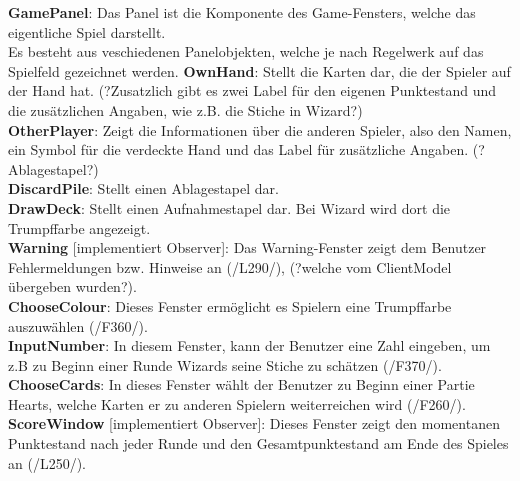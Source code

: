 \documentclass{article}
\begin{document}
\textbf{GamePanel}: Das Panel ist die Komponente des Game-Fensters, welche das eigentliche Spiel darstellt.\\
Es besteht aus veschiedenen Panelobjekten, welche je nach Regelwerk auf das Spielfeld gezeichnet werden.
\textbf{OwnHand}: Stellt die Karten dar, die der Spieler auf der Hand hat. (?Zusatzlich gibt es zwei Label für den eigenen Punktestand und die zusätzlichen Angaben, wie z.B. die Stiche in Wizard?)\\
\textbf{OtherPlayer}: Zeigt die Informationen über die anderen Spieler, also den Namen, ein Symbol für die verdeckte Hand und das Label für zusätzliche Angaben. (?Ablagestapel?)\\
\textbf{DiscardPile}: Stellt einen Ablagestapel dar.\\
\textbf{DrawDeck}: Stellt einen Aufnahmestapel dar. Bei Wizard wird dort die Trumpffarbe angezeigt.\\

\textbf{Warning} [implementiert Observer]: Das Warning-Fenster zeigt dem Benutzer Fehlermeldungen bzw. Hinweise an (/L290/), (?welche vom ClientModel übergeben wurden?). \\

\textbf{ChooseColour}: Dieses Fenster ermöglicht es Spielern eine Trumpffarbe auszuwählen (/F360/). \\

\textbf{InputNumber}: In diesem Fenster, kann der Benutzer eine Zahl eingeben, um z.B zu Beginn einer Runde Wizards seine Stiche zu schätzen (/F370/). \\

\textbf{ChooseCards}: In dieses Fenster wählt der Benutzer zu Beginn einer Partie Hearts, welche Karten er zu anderen Spielern weiterreichen wird (/F260/). \\

\textbf{ScoreWindow} [implementiert Observer]: Dieses Fenster zeigt den momentanen Punktestand nach jeder Runde und den Gesamtpunktestand am Ende des Spieles an (/L250/).\\
\end{document}
